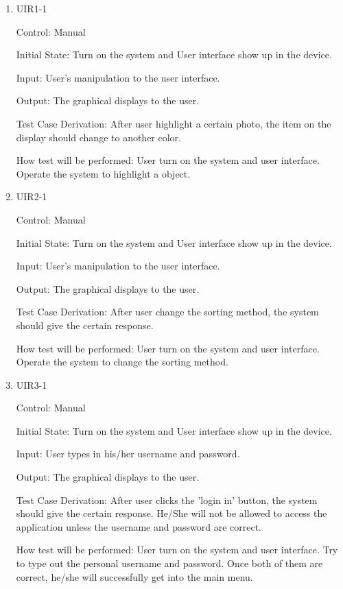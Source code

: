 \documentclass[12pt, titlepage]{article}
\begin{document}
\begin{enumerate}

\item{UIR1-1\\}

Control: Manual
					
Initial State: Turn on the system and User interface show up in the device.
					
Input: User's manipulation to the user interface.
					
Output: The graphical displays to the user.

Test Case Derivation: After user highlight a certain photo, the item on the display should change to another color.
					
How test will be performed: User turn on the system and user interface. Operate the system to highlight a object.		
	
	
\item{UIR2-1\\}

Control: Manual
					
Initial State: Turn on the system and User interface show up in the device.
					
Input: User's manipulation to the user interface.
					
Output: The graphical displays to the user.

Test Case Derivation: After user change the sorting method, the system should give the certain response.
					
How test will be performed: User turn on the system and user interface. Operate the system to change the sorting method.


\item{UIR3-1\\}

Control: Manual
					
Initial State: Turn on the system and User interface show up in the device.
					
Input: User types in his/her username and password.
					
Output: The graphical displays to the user.

Test Case Derivation: After user clicks the 'login in' button, the system should give the certain response. He/She will not be allowed to access the application unless the username and password are correct.
					
How test will be performed: User turn on the system and user interface. Try to type out the personal username and password. Once both of them are correct, he/she will successfully get into the main menu.
	

\end{enumerate}
\end{document}
